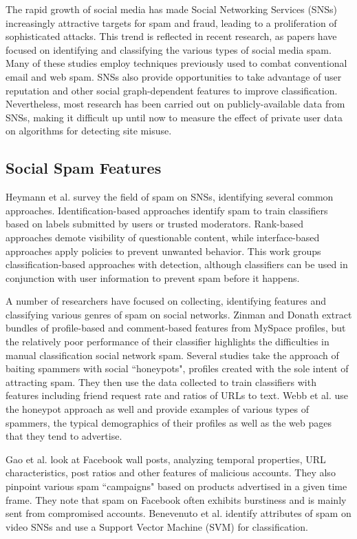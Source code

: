 \documentclass[preprint]{acm_proc_article-sp}
\begin{document}
The rapid growth of social media has made Social Networking Services (SNSs) increasingly attractive targets for spam and fraud, leading to a proliferation of sophisticated attacks. This trend is reflected in recent research, as papers have focused on identifying and classifying the various types of social media spam. Many of these studies employ techniques previously used to combat conventional email and web spam. SNSs also provide opportunities to take advantage of user reputation and other social graph-dependent features to improve classification. Nevertheless, most research has been carried out on publicly-available data from SNSs, making it difficult up until now to measure the effect of private user data on algorithms for detecting site misuse.


\subsection{Social Spam Features}

Heymann et al. \cite{heymann} survey the field of spam on SNSs, identifying several common approaches. Identification-based approaches identify spam to train classifiers based on labels submitted by users or trusted moderators. Rank-based approaches demote visibility of questionable content, while interface-based approaches apply policies to prevent unwanted behavior. This work groups classification-based approaches with detection, although classifiers can be used in conjunction with user information to prevent spam before it happens.

A number of researchers have focused on collecting, identifying features and classifying various genres of spam on social networks. Zinman and Donath \cite{zinman} extract bundles of profile-based and comment-based features from MySpace profiles, but the relatively poor performance of their classifier highlights the difficulties in manual classification social network spam. Several studies take the approach of baiting spammers with social ``honeypots", profiles created with the sole intent of attracting spam.\cite{stringhini, lee} They then use the data collected to train classifiers with features including friend request rate and ratios of URLs to text. Webb et al. \cite{webb} use the honeypot approach as well and provide examples of various types of spammers, the typical demographics of their profiles as well as the web pages that they tend to advertise. 

Gao et al. \cite{gao} look at Facebook wall posts, analyzing temporal properties, URL characteristics, post ratios and other features of malicious accounts. They also pinpoint various spam ``campaigns" based on products advertised in a given time frame. They note that spam on Facebook often exhibits burstiness and is mainly sent from compromised accounts. Benevenuto et al. \cite{benevenuto} identify attributes of spam on video SNSs and use a Support Vector Machine (SVM) for classification.
\end{document}
